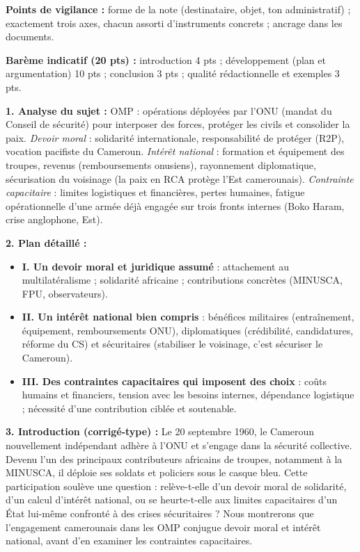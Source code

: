 \documentclass[11pt]{article}
\newcommand{\cle}[1]{{\popxbold\color{popdark}#1}}
\begin{document}
\begin{corrige}
\textbf{Points de vigilance :} forme de la note (destinataire, objet, ton administratif) ; exactement trois axes, chacun assorti d'instruments concrets ; ancrage dans les documents.
\end{corrige}

\begin{corrige}
\textbf{Barème indicatif (20 pts) :} introduction 4 pts ; développement (plan et argumentation) 10 pts ; conclusion 3 pts ; qualité rédactionnelle et exemples 3 pts.

\textbf{1. Analyse du sujet :} \cle{OMP} : opérations déployées par l'ONU (mandat du Conseil de sécurité) pour interposer des forces, protéger les civils et consolider la paix. \emph{Devoir moral} : solidarité internationale, responsabilité de protéger (R2P), vocation pacifiste du Cameroun. \emph{Intérêt national} : formation et équipement des troupes, revenus (remboursements onusiens), rayonnement diplomatique, sécurisation du voisinage (la paix en RCA protège l'Est camerounais). \emph{Contrainte capacitaire} : limites logistiques et financières, pertes humaines, fatigue opérationnelle d'une armée déjà engagée sur trois fronts internes (Boko Haram, crise anglophone, Est).

\textbf{2. Plan détaillé :}
\begin{itemize}
    \item \textbf{I. Un devoir moral et juridique assumé} : attachement au multilatéralisme ; solidarité africaine ; contributions concrètes (MINUSCA, FPU, observateurs).
    \item \textbf{II. Un intérêt national bien compris} : bénéfices militaires (entraînement, équipement, remboursements ONU), diplomatiques (crédibilité, candidatures, réforme du CS) et sécuritaires (stabiliser le voisinage, c'est sécuriser le Cameroun).
    \item \textbf{III. Des contraintes capacitaires qui imposent des choix} : coûts humains et financiers, tension avec les besoins internes, dépendance logistique ; nécessité d'une contribution ciblée et soutenable.
\end{itemize}

\textbf{3. Introduction (corrigé-type) :} Le 20 septembre 1960, le Cameroun nouvellement indépendant adhère à l'ONU et s'engage dans la sécurité collective. Devenu l'un des principaux contributeurs africains de troupes, notamment à la MINUSCA, il déploie ses soldats et policiers sous le casque bleu. Cette participation soulève une question : relève-t-elle d'un devoir moral de solidarité, d'un calcul d'intérêt national, ou se heurte-t-elle aux limites capacitaires d'un État lui-même confronté à des crises sécuritaires ? Nous montrerons que l'engagement camerounais dans les OMP conjugue devoir moral et intérêt national, avant d'en examiner les contraintes capacitaires.


\end{corrige}
\end{document}
